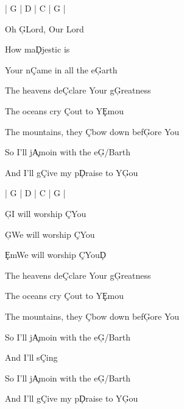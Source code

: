 \documentclass[9pt]{extarticle}
\begin{document}
\bsong

\bi
| G | D | C | G |
\ei

\bv[2]
Oh \c{G}Lord, Our Lord

How ma\c{D}jestic is

Your n\c{C}ame in all the e\c{G}arth
\ev

\bc
The heavens de\c{C}clare Your g\c{G}reatness

The oceans cry \c{C}out to Y\c{Em}ou

The mountains, they \c{C}bow down bef\c{G}ore You

So I'll j\c{Am}oin with the e\c{G/B}arth

And I'll g\c{C}ive my p\c{D}raise to Y\c{G}ou
\ec

\bin
| G | D | C | G |
\ein



\bb[4]
\c{G}I will worship \c{C}You
\eb

\bb
\c{G}We will worship \c{C}You

\c{Em}We will worship \c{C}You\c{D}
\eb

\bc
The heavens de\c{C}clare Your g\c{G}reatness

The oceans cry \c{C}out to Y\c{Em}ou

The mountains, they \c{C}bow down bef\c{G}ore You

So I'll j\c{Am}oin with the e\c{G/B}arth

And I'll s\c{C}ing
\ec


\bo[2]
So I'll j\c{Am}oin with the e\c{G/B}arth

And I'll g\c{C}ive my p\c{D}raise to Y\c{G}ou
\eo

\esong
\end{document}
